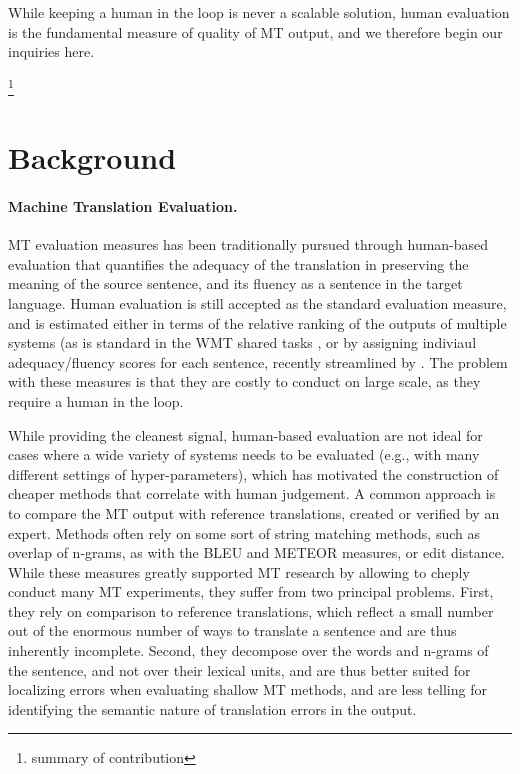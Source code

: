 \documentclass[11pt]{article}
\newcommand{\oa}[1]{\footnote{\color{red} #1}}
\begin{document}
While keeping a human in the loop is never a scalable solution, human evaluation is the
fundamental measure of quality of MT output, and we therefore begin our inquiries here.

\oa{summary of contribution}

\section{Background}\label{sec:background}

\paragraph{Machine Translation Evaluation.}
MT evaluation measures has been traditionally pursued through human-based
evaluation that quantifies the adequacy of the translation in preserving the meaning
of the source sentence, and its fluency as a sentence in the target language.
Human evaluation is still accepted as the standard evaluation measure, and is
estimated either in terms of the relative ranking of the outputs of multiple systems
(as is standard in the WMT shared tasks \cite[inter alia]{wmt14}, or by assigning
indiviaul adequacy/fluency scores for each sentence, recently streamlined by .
The problem with these measures is that they are costly to conduct on large scale, as
they require a human in the loop.

While providing the cleanest signal, human-based evaluation are not ideal for cases where
a wide variety of systems needs to be evaluated (e.g., with many different settings of hyper-parameters),
which has motivated the construction of cheaper methods that correlate with human
judgement. A common approach is to compare the MT output with reference translations,
created or verified by an expert. Methods often rely on some sort of string matching
methods, such as overlap of n-grams, as with the BLEU and METEOR measures, or edit
distance. While these measures greatly supported MT research by allowing to cheply
conduct many MT experiments, they suffer from two principal problems.
First, they rely on comparison to reference translations, which reflect a small
number out of the enormous number of ways to translate a sentence and are thus
inherently incomplete. Second, they decompose over the words and n-grams of the sentence,
and not over their lexical units, and are thus better suited for localizing errors
when evaluating shallow MT methods, and are less telling for identifying the semantic
nature of translation errors in the output. 
\end{document}
